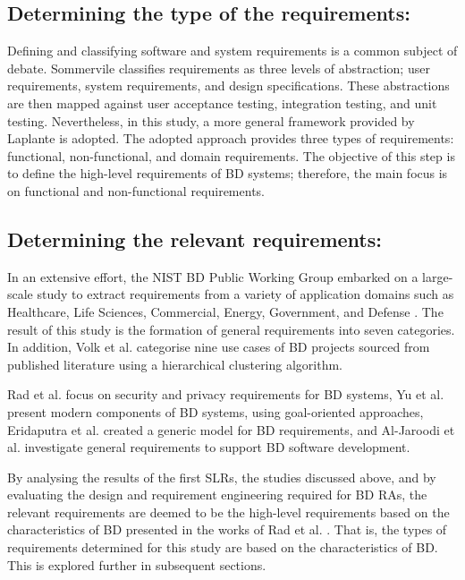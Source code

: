 \documentclass[preprint,12pt]{elsarticle}
\begin{document}
\subsection{Determining the type of the requirements:}

Defining and classifying software and system requirements is a common subject of debate. Sommervile \cite{sommerville2011software} classifies requirements as three levels of abstraction; user requirements, system requirements, and design specifications. These abstractions are then mapped against user acceptance testing, integration testing, and unit testing. Nevertheless, in this study, a more general framework provided by Laplante \cite{laplante2017requirements} is adopted. The adopted approach provides three types of requirements: functional, non-functional, and domain requirements. The objective of this step is to define the high-level requirements of BD systems; therefore, the main focus is on functional and non-functional requirements. 

\subsection{Determining the relevant requirements:}

In an extensive effort, the NIST BD Public Working Group embarked on a large-scale study to extract requirements from a variety of application domains such as Healthcare, Life Sciences, Commercial, Energy, Government, and Defense \cite{Chang}. The result of this study is the formation of general requirements into seven categories. In addition, Volk et al. \cite{volk2020identifying} categorise nine use cases of BD projects sourced from published literature using a hierarchical clustering algorithm. 

Rad et al. \cite{AtaeiSecurity} focus on security and privacy requirements for BD systems, Yu et al. \cite{yu2019components} present modern components of BD systems, using goal-oriented approaches, Eridaputra et al. \cite{eridaputra2014modeling} created a generic model for BD requirements, and Al-Jaroodi et al. \cite{al2016characteristics} investigate general requirements to support BD software development. 

By analysing the results of the first SLRs, the studies discussed above, and by evaluating the design and requirement engineering required for BD RAs, the relevant requirements are deemed to be the high-level requirements based on the characteristics of BD presented in the works of Rad et al. \cite{Rada2017}. That is, the types of requirements determined for this study are based on the characteristics of BD. This is explored further in subsequent sections.
\end{document}
